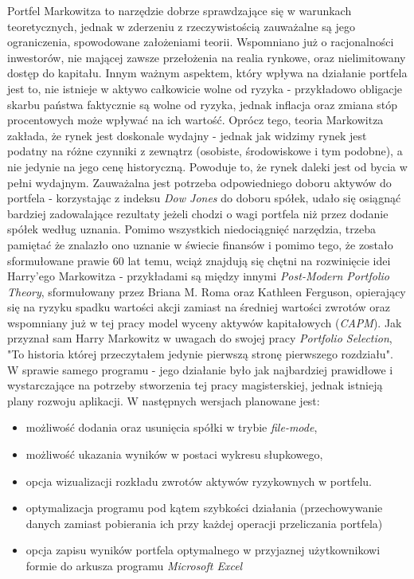 \documentclass[magister]{dyplom}
\begin{document}
Portfel Markowitza to narzędzie dobrze sprawdzające się w warunkach teoretycznych, jednak w zderzeniu z rzeczywistością zauważalne są jego ograniczenia, spowodowane założeniami teorii. Wspomniano już o racjonalności inwestorów, nie mającej zawsze przełożenia na realia rynkowe, oraz nielimitowany dostęp do kapitału. Innym ważnym aspektem, który wpływa na działanie portfela jest to, nie istnieje w aktywo całkowicie wolne od ryzyka - przykładowo obligacje skarbu państwa faktycznie są wolne od ryzyka, jednak inflacja oraz zmiana stóp procentowych może wpływać na ich wartość.\cite{hip} Oprócz tego, teoria Markowitza zakłada, że rynek jest doskonale wydajny \cite{markowitz} - jednak jak widzimy rynek jest podatny na różne czynniki z zewnątrz (osobiste, środowiskowe i tym podobne), a nie jedynie na jego cenę historyczną. Powoduje to, że rynek daleki jest od bycia w pełni wydajnym.
Zauważalna jest potrzeba odpowiedniego doboru aktywów do portfela - korzystając z indeksu \textit{Dow Jones} do doboru spółek, udało się osiągnąć bardziej zadowalające rezultaty jeżeli chodzi o wagi portfela niż przez dodanie spółek według uznania.
Pomimo wszystkich niedociągnięć narzędzia, trzeba pamiętać że znalazło ono uznanie w świecie finansów i pomimo tego, że zostało sformułowane prawie 60 lat temu, wciąż znajdują się chętni na rozwinięcie idei Harry'ego Markowitza - przykładami są między innymi \textit{Post-Modern Portfolio Theory}, sformułowany przez Briana M. Roma oraz Kathleen Ferguson, opierający się na ryzyku spadku wartości akcji zamiast na średniej wartości zwrotów\cite{pmpt} oraz wspomniany już w tej pracy model wyceny aktywów kapitałowych (\textit{CAPM})\cite{holton}. Jak przyznał sam Harry Markowitz w uwagach do swojej pracy \textit{Portfolio Selection}, "To historia której przeczytałem jedynie pierwszą stronę pierwszego rozdziału"\cite{markowitz}.
\\
W sprawie samego programu - jego działanie było jak najbardziej prawidłowe i wystarczające na potrzeby stworzenia tej pracy magisterskiej, jednak istnieją plany rozwoju aplikacji. W następnych wersjach planowane jest:
\begin{itemize}
	\item możliwość dodania oraz usunięcia spółki w trybie \textit{file-mode},
	\item możliwość ukazania wyników w postaci wykresu słupkowego,
	\item opcja wizualizacji rozkładu zwrotów aktywów ryzykownych w portfelu.
	\item optymalizacja programu pod kątem szybkości działania (przechowywanie danych zamiast pobierania ich przy każdej operacji przeliczania portfela)
	\item opcja zapisu wyników portfela optymalnego w przyjaznej użytkownikowi formie do arkusza programu \textit{Microsoft Excel}
\end{itemize}
\end{document}
